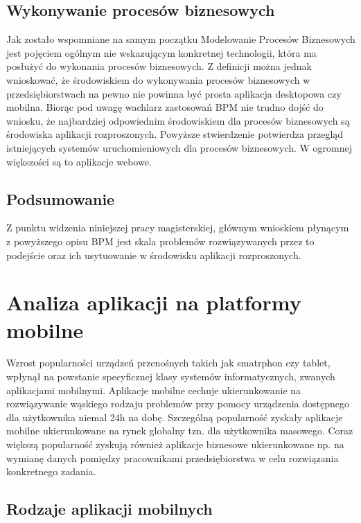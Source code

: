 \subsection{Wykonywanie procesów biznesowych}
\label{sec:wykonywanieBPM}

Jak zostało wspomniane na samym początku Modelowanie Procesów Biznesowych jest pojęciem ogólnym nie wskazującym konkretnej technologii, która ma posłużyć do wykonania procesów biznesowych. Z definicji można jednak wnioskować, że środowiskiem do wykonywania procesów biznesowych w przedsiębiorstwach na pewno nie powinna być prosta aplikacja desktopowa czy mobilna. Biorąc pod uwagę wachlarz zastosowań BPM nie trudno dojść do wniosku, że najbardziej odpowiednim środowiskiem dla procesów biznesowych są środowiska aplikacji rozproszonych. 
Powyższe stwierdzenie potwierdza przegląd istniejących systemów uruchomieniowych dla procesów biznesowych. W ogromnej większości są to aplikacje webowe. 

\subsection{Podsumowanie}
\label{sec:podsumowanieBPM}

Z punktu widzenia niniejszej pracy magisterskiej, głównym wnioskiem płynącym z powyższego opisu BPM jest skala problemów rozwiązywanych przez to podejście oraz ich usytuowanie w środowisku aplikacji rozproszonych. 

\section{Analiza aplikacji na platformy mobilne}
\label{sec:analizaAplikacjiMobilnych}

Wzrost popularności urządzeń przenośnych takich jak smatrphon czy tablet, wpłynął na powstanie specyficznej klasy systemów informatycznych, zwanych aplikacjami mobilnymi. Aplikacje mobilne cechuje ukierunkowanie na rozwiązywanie wąskiego rodzaju problemów przy pomocy urządzenia dostępnego dla użytkownika niemal 24h na dobę. Szczególną popularność zyskały aplikacje mobilne ukierunkowane na rynek globalny tzn. dla użytkownika masowego. Coraz większą popularność zyskują również aplikacje biznesowe ukierunkowane np. na wymianę danych pomiędzy pracownikami przedsiębiorstwa w celu rozwiązania konkretnego zadania. 

\subsection{Rodzaje aplikacji mobilnych}
\label{sec:rodzajeAplikacjiMobilnych}

